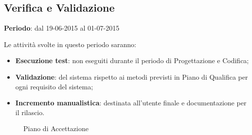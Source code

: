 {\newpage
\subsection{Verifica e Validazione}{
	\textbf{Periodo}: dal 19-06-2015 al 01-07-2015
	
	Le attivit\`a svolte in questo periodo saranno:
	\begin{itemize}
		\item \textbf{Esecuzione test}: non eseguiti durante il periodo di Progettazione e Codifica;
		\item \textbf{Validazione}: del sistema rispetto ai metodi previsti in Piano di Qualifica per ogni requisito del sistema;
		\item \textbf{Incremento manualistica}: destinata all'utente finale e documentazione per il rilascio.
	\end{itemize}

	\begin{landscape}
		\thispagestyle{empty}	
		\begin{figure}[H]
			\parbox[c][\textwidth][s]{\linewidth}{
			\centering
			\vspace*{\fill}
			\vspace*{\fill}
			\label{fig:pianoaccettazione}
			\caption{Piano di Accettazione}}
		\end{figure}
	\end{landscape}
	
}}
